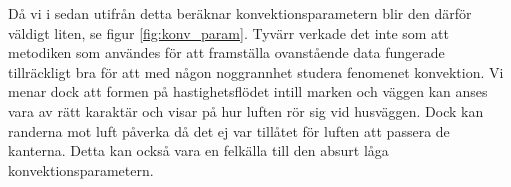 Då vi i sedan utifrån detta beräknar konvektionsparametern blir den därför väldigt liten,
se figur \ref{fig:konv_param}. Tyvärr verkade det inte som att metodiken som användes
för att framställa ovanstående data fungerade tillräckligt bra för att med någon
noggrannhet studera fenomenet konvektion.  Vi menar dock att formen på hastighetsflödet intill marken och väggen
kan anses vara av rätt karaktär och visar på hur luften rör sig vid husväggen. Dock kan randerna mot
luft påverka då det ej var tillåtet för luften att passera de
kanterna. Detta kan också vara en felkälla till den absurt låga konvektionsparametern.

\begin{figure}[hpbt]
\centering
{}
\vspace{1cm}


\end{figure}
